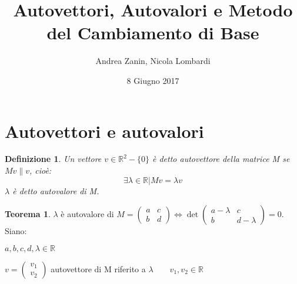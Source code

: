 \documentclass[10pt,a4paper]{article}
\author{Andrea Zanin, Nicola Lombardi}
\title{\textbf{Autovettori, Autovalori e Metodo del Cambiamento di Base}}
\date{8 Giugno 2017}
\theoremstyle{plain}
\newtheorem{definizione}[subsection]{Definizione}
\theoremstyle{definition}
\newtheorem{teorema}[subsection]{Teorema}
\begin{document}
\maketitle
\section{Autovettori e autovalori}
\begin{definizione}
	Un vettore ${v} \in \mathbb{R}^2 -\{{0}\}$ è detto autovettore della matrice M se $M{v}\parallel{v}$, cioè: \\
	\[\exists \lambda \in \mathbb{R} \vert M{v}=\lambda{v}\]
	$\lambda$ è detto autovalore di M.
\end{definizione}
\begin{teorema}$\lambda$ è autovalore di $M=\begin{pmatrix}
	a & c \\ b & d
	\end{pmatrix} \Leftrightarrow \det{\begin{pmatrix}
		a-\lambda & c \\ b & d-\lambda
		\end{pmatrix}}=0$. \\
	
\proof
\[\]
Siano:

$a,b,c,d,\lambda\in\mathbb{R}$ 

${v}=
\begin{pmatrix}
v_1 \\ v_2
\end{pmatrix}$ autovettore di M riferito a $\lambda\quad\quad v_1,v_2\in\mathbb{R}$ 


\end{teorema}
\end{document}
